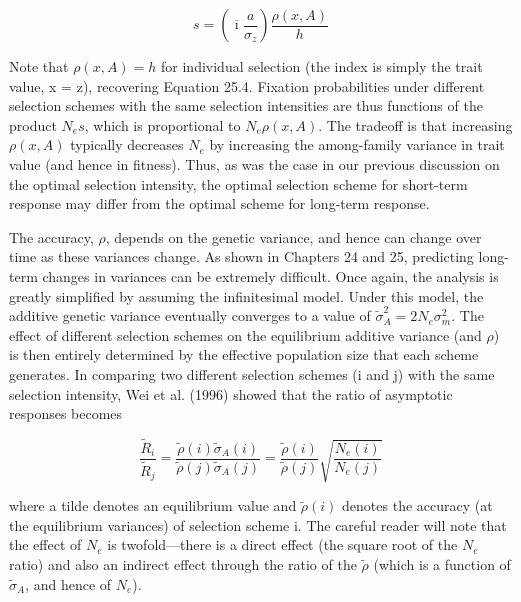\documentclass{article}
\begin{document}
{\begin{equation}
s=\left(\overline{\imath}\frac{a}{\sigma_{z}}\right)\frac{\rho(x,A)}{h}
\tag{26.37}
\label{eq:26_37}
\end{equation}

Note that  $ \rho(x, A) = h $ for individual selection (the index is simply the trait value, x = z), recovering Equation 25.4. Fixation probabilities under different selection schemes with the same selection intensities are thus functions of the product  $ N_e s $, which is proportional to  $ N_e \rho(x, A) $. The tradeoff is that increasing  $ \rho(x, A) $ typically decreases  $ N_e $ by increasing the among-family variance in trait value (and hence in fitness). Thus, as was the case in our previous discussion on the optimal selection intensity, the optimal selection scheme for short-term response may differ from the optimal scheme for long-term response.

The accuracy,  $ \rho $, depends on the genetic variance, and hence can change over time as these variances change. As shown in Chapters 24 and 25, predicting long-term changes in variances can be extremely difficult. Once again, the analysis is greatly simplified by assuming the infinitesimal model. Under this model, the additive genetic variance eventually converges to a value of  $ \widetilde{\sigma}_{A}^{2}=2N_{e}\sigma_{m}^{2} $. The effect of different selection schemes on the equilibrium additive variance (and  $ \rho $) is then entirely determined by the effective population size that each scheme generates. In comparing two different selection schemes (i and j) with the same selection intensity, Wei et al. (1996) showed that the ratio of asymptotic responses becomes

\begin{equation}
\frac{\widetilde{R}_{i}}{\widetilde{R}_{j}}=\frac{\widetilde{\rho}(i)\widetilde{\sigma}_{A}(i)}{\widetilde{\rho}(j)\widetilde{\sigma}_{A}(j)}=\frac{\widetilde{\rho}(i)}{\widetilde{\rho}(j)}\sqrt{\frac{N_{e}(i)}{N_{e}(j)}}
\tag{26.38}
\label{eq:26_38}
\end{equation}

where a tilde denotes an equilibrium value and  $ \widetilde{\rho}(i) $ denotes the accuracy (at the equilibrium variances) of selection scheme i. The careful reader will note that the effect of  $ N_e $ is twofold—there is a direct effect (the square root of the  $ N_e $ ratio) and also an indirect effect through the ratio of the  $ \widetilde{\rho} $ (which is a function of  $ \widetilde{\sigma}_A $, and hence of  $ N_e $).

}
\end{document}

